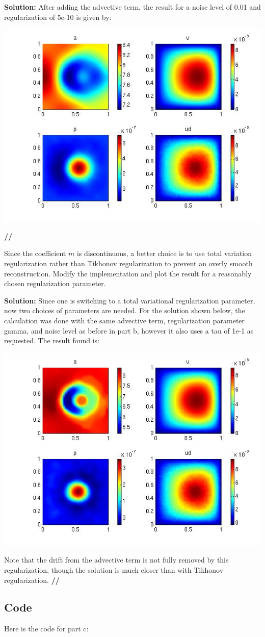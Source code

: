 \documentclass[11pt]{article}
\newenvironment{solution}{\begin{trivlist}\item[]{\bf Solution:}}
                      {\textbf{//} \end{trivlist}}
\begin{document}
\begin{enumerate}
\begin{solution}
After adding the advective term, the result for a noise level of 0.01 and regularization of 5e-10 is given by:
\begin{center}
\includegraphics[width = 6 cm]{figs/prob2bNoiseRegM8.jpg}
\end{center}
\end{solution}

\item[(c)]Since the coefficient $m$ is discontinuous, a better choice is to use total variation
regularization rather than Tikhonov regularization to prevent an overly smooth
reconstruction. Modify the implementation and plot the result for a reasonably
chosen regularization parameter.

\begin{solution}
Since one is switching to a total variational regularization parameter,
 now two choices of parameters are needed. For the solution shown below,
 the calculation was done with the same advective term, regularization
 parameter gamma, and noise level as before in part b, however it also
 uses a tau of 1e-1 as requested. The result found is: 
\begin{center}
\includegraphics[width = 6 cm]{figs/prob2c.jpg}
\end{center}
Note that the drift from the advective term is not fully removed by this
 regularization, though the solution is much closer than with Tikhonov
 regularization. 
\end{solution}
\end{enumerate}

\newpage
\subsection*{Code}
Here is the code for part c:

\end{document}
